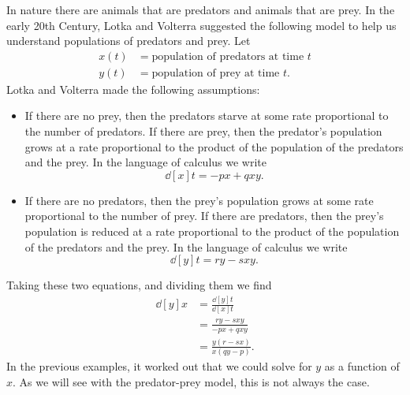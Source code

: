 \documentclass{ximera}
\begin{document}
In nature there are animals that are predators and animals that are
prey. In the early 20th Century, Lotka and Volterra suggested the
following model to help us understand populations of predators and
prey. Let
\begin{align*}
  x(t) &= \text{population of predators at time $t$}\\
  y(t) &= \text{population of prey at time $t$}.
\end{align*}
Lotka and Volterra made the following assumptions:
\begin{itemize}
  \item If there are no prey, then the predators starve at some rate
    proportional to the number of predators. If there are prey, then
    the predator's population grows at a rate proportional to the product of the
    population of the predators and the prey. In the language of calculus we write
    \[
    \dd[x]{t} = -p x + q x y.
    \]
  \item If there are no predators, then the prey's population grows
    at some rate proportional to the number of prey. If there are
    predators, then the prey's population is reduced at a rate
    proportional to the product of the population of the predators and
    the prey. In the language of calculus we write
    \[
    \dd[y]{t} = r y - s xy.
    \]
\end{itemize}
Taking these two equations, and dividing them we find
\begin{align*}
\dd[y]{x} &= \frac{\dd[y]{t}}{\dd[x]{t}}\\
&=\frac{r y - s xy}{-p x + q x y}\\
&=\frac{y(r-sx)}{x(qy-p)}.
\end{align*}
In the previous examples, it worked out that we could solve for $y$ as
a function of $x$.  As we will see with the predator-prey model, this
is not always the case.
\end{document}
